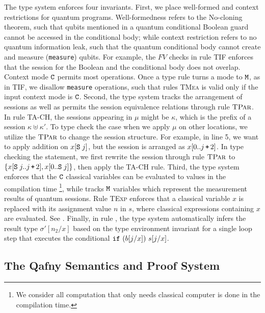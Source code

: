 The type system enforces four invariants.  First, we place well-formed and context restrictions for quantum programs.
Well-formedness refers to the No-cloning theorem, such that qubits mentioned in a quantum conditional Boolean guard cannot be accessed in the conditional body; while context restriction refers to no quantum information leak, such that the quantum conditional body cannot create and measure (\texttt{measure}) qubits.
For example, the $FV$ checks in rule \textsc{TIF} enforces that the session for the Boolean and the conditional body does not overlap.
Context mode $\texttt{C}$ permits most \qafny operations. Once a type rule turns a mode to $\texttt{M}$, as in \textsc{TIF}, we disallow \texttt{measure} operations, such that rules \textsc{TMea} is valid only if the input context mode is $\texttt{C}$.
Second, the type system tracks the arrangement of sessions as well as permits the session equivalence relations through rule $\textsc{TPar}$. In rule \textsc{TA-CH}, the sessions appearing in $\mu$ might be $\kappa$, which is the prefix of a session $\kappa \uplus \kappa'$. To type check the case when we apply $\mu$ on other locations, we utilize the $\textsc{TPar}$ to change the session structure. For example, in  line 5, we want to apply addition on $x[\texttt{S}\;j]$, but the session is arranged as $x[0..j\,\texttt{+}\,2]$. In type checking the statement, we first rewrite the session through rule $\textsc{TPar}$ to $\{x[\texttt{S}\;j..j\,\texttt{+}\,2],x[0..\texttt{S}\;j]\}$, then apply the \textsc{TA-CH} rule.
Third, the type system enforces that the $\texttt{C}$ classical variables can be evaluated to values in the compilation time \footnote{We consider all computation that only needs classical computer is done in the compilation time.}, while tracks $\texttt{M}$ variables which represent the measurement results of quantum sessions. Rule \textsc{TExp} enforces that a classical variable $x$ is replaced with its assignment value $n$ in $s$, where classical expressions containing $x$ are evaluated. See .
Finally, in rule , the type system automatically infers the result type $\sigma'[n_2/x]$ based on the type environment invariant for a single loop step that executes the conditional $\texttt{if}~{(b[j/x])}~{s[j/x]}$.

\subsection{The Qafny Semantics and Proof System}\label{sec:semantics-proof}

